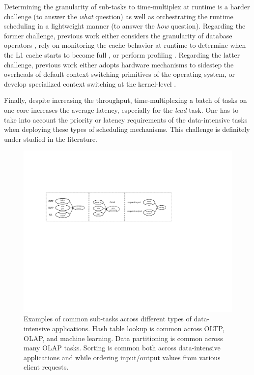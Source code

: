 \documentclass[11pt,dvipdfm]{article}
\begin{document}
Determining the granularity of sub-tasks to time-multiplex at runtime is a harder challenge
(to answer the \textit{what} question)
as well as orchestrating the runtime scheduling in a lightweight manner
(to answer the \textit{how} question).
Regarding the former challenge,
previous work either considers the granularity of database operators \cite{HarizopoulosSA05},
rely on monitoring the cache behavior at runtime
to determine when the L1 cache starts to become full \cite{AttaTTAM13},
or perform profiling \cite{HarizopoulosA04}.
Regarding the latter challenge,
previous work either adopts hardware mechanisms \cite{AttaTTAM13}
to sidestep the overheads of default context switching primitives of the operating system,
or develop specialized context switching at the kernel-level \cite{HarizopoulosA04}.

Finally, despite increasing the throughput,
time-multiplexing a batch of tasks on one core increases the average latency,
especially for the \textit{lead} task.
One has to take into account the priority or latency requirements of
the data-intensive tasks when deploying these types of scheduling mechanisms.
This challenge is definitely under-studied in the literature.

\begin{figure}
\centering
\includegraphics{figs/fig-common.pdf}
\caption{Examples of common sub-tasks across different types of data-intensive applications.
Hash table lookup is common across OLTP, OLAP, and machine learning.
Data partitioning is common across many OLAP tasks.
Sorting is common both across data-intensive applications and
while ordering input/output values from various client requests.}
\label{fig:common}
\end{figure}
\end{document}
